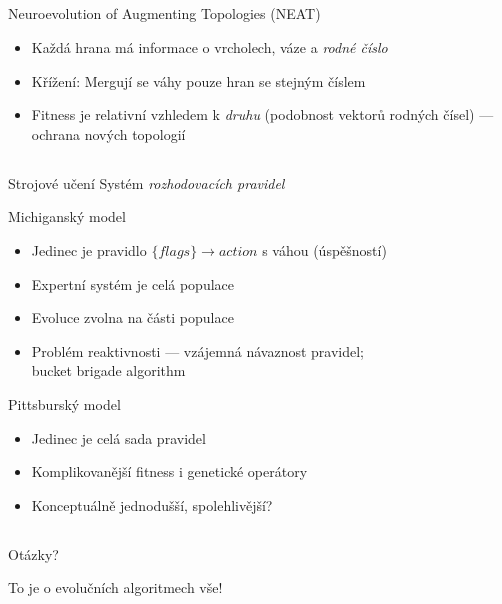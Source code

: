 \documentclass{beamer}
\begin{document}
\subsection{}
\begin{frame}{Neuroevolution of Augmenting Topologies (NEAT)}
\begin{itemize}
\item Každá hrana má informace o vrcholech, váze a {\em rodné číslo}
\item Křížení: Mergují se váhy pouze hran se stejným číslem
\item Fitness je relativní vzhledem k {\em druhu} (podobnost vektorů rodných čísel) --- ochrana nových topologií
\end{itemize}
\end{frame}

\subsection{}
\begin{frame}{Strojové učení}
Systém {\em rozhodovacích pravidel}

\begin{block}{Michiganský model}
\begin{itemize}
\item Jedinec je pravidlo $\{flags\} \to action$ s váhou (úspěšností)
\item Expertní systém je celá populace
\item Evoluce zvolna na části populace
\item Problém reaktivnosti --- vzájemná návaznost pravidel; \\ bucket brigade algorithm
\end{itemize}
\end{block}

\begin{block}{Pittsburský model}
\begin{itemize}
\item Jedinec je celá sada pravidel
\item Komplikovanější fitness i genetické operátory
\item Konceptuálně jednodušší, spolehlivější?
\end{itemize}
\end{block}
\end{frame}

\subsection{}
\begin{frame}{Otázky?}
\begin{center}
To je o evolučních algoritmech vše!
\end{center}
\end{frame}
\end{document}
